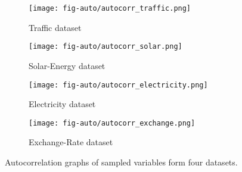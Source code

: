 \documentclass[sigconf]{acmart}
\def\electricity{{\sf Electricity}\xspace}
\def\traffic{{\sf Traffic}\xspace}
\def\solar{{\sf Solar-Energy}\xspace}
\def\exchange{{\sf Exchange-Rate}\xspace}
\begin{document}
\begin{figure}[!ht]
\begin{subfigure}{.23\textwidth}
  \centering
  \texttt{[image: fig-auto/autocorr\_traffic.png]}
  \caption{\traffic dataset}
\end{subfigure}
\begin{subfigure}{.23\textwidth}
  \centering
  \texttt{[image: fig-auto/autocorr\_solar.png]}
  \caption{\solar dataset}
\end{subfigure}
\begin{subfigure}{.23\textwidth}
  \centering
  \texttt{[image: fig-auto/autocorr\_electricity.png]}
  \caption{\electricity dataset}
\end{subfigure}
\begin{subfigure}{.23\textwidth}
  \centering
  \texttt{[image: fig-auto/autocorr\_exchange.png]}
  \caption{\exchange dataset}
\end{subfigure}
\caption{Autocorrelation graphs of sampled variables form four datasets.}
\label{fig:autocorrelation}
\end{figure}
\end{document}
